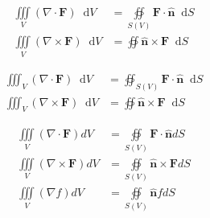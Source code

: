 \documentclass{article}
\newcommand*\VF[1]{\mathbf{#1}}
\newcommand*\dif{\mathop{}\!\mathrm{d}}
\begin{document}
\begin{align*}
  \iiint\limits_V (\nabla \cdot \VF{F}) \dif V
  &= \oiint\limits_{S(V)} \VF{F} \cdot \hat{\VF{n}} \dif S\\
  \iiint\limits_V (\nabla \times \VF{F}) \dif V
  &= \oiint \hat{\VF{n}} \times \VF{F} \dif S
\end{align*}





\begin{align*}
  \iiint_{V} (\nabla \cdot \VF{F}) \dif V
  &= \oiint_{S(V)} \VF{F} \cdot \hat{\VF{n}} \dif S\\
  \iiint_{V} (\nabla \times \VF{F}) \dif V
  &= \oiint \hat{\VF{n}} \times \VF{F} \dif S
\end{align*}


\begin{align*}
  \iiint\limits_V(\nabla \cdot \mathbf{F}) dV
      & = \oiint \limits_{S(V)} \mathbf{F \cdot \hat{n}} dS \\
  \iiint\limits_V(\nabla \times \mathbf{F}) dV
      & = \oiint \limits_{S(V)} \mathbf{\hat{n} \times F} dS \\
  \iiint\limits_V(\nabla f) dV
      & = \oiint\limits_{S(V)}\mathbf{\hat{n}}f dS
\end{align*}
\end{document}
